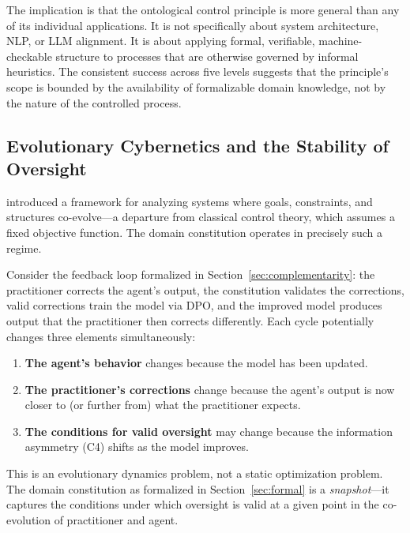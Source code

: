 \documentclass[11pt]{article}
\begin{document}
The implication is that the ontological control principle is more general than any of its individual applications.
It is not specifically about system architecture, NLP, or LLM alignment.
It is about applying formal, verifiable, machine-checkable structure to processes that are otherwise governed by informal heuristics.
The consistent success across five levels suggests that the principle's scope is bounded by the availability of formalizable domain knowledge, not by the nature of the controlled process.

\subsection{Evolutionary Cybernetics and the Stability of Oversight}
\label{sec:disc-evolutionary}

\citet{palagin2025evolutionary} introduced a framework for analyzing systems where goals, constraints, and structures co-evolve---a departure from classical control theory, which assumes a fixed objective function.
The domain constitution operates in precisely such a regime.

Consider the feedback loop formalized in Section~\ref{sec:complementarity}: the practitioner corrects the agent's output, the constitution validates the corrections, valid corrections train the model via DPO, and the improved model produces output that the practitioner then corrects differently.
Each cycle potentially changes three elements simultaneously:

\begin{enumerate}[nosep]
\item \textbf{The agent's behavior} changes because the model has been updated.
\item \textbf{The practitioner's corrections} change because the agent's output is now closer to (or further from) what the practitioner expects.
\item \textbf{The conditions for valid oversight} may change because the information asymmetry (C4) shifts as the model improves.
\end{enumerate}

This is an evolutionary dynamics problem, not a static optimization problem.
The domain constitution as formalized in Section~\ref{sec:formal} is a \emph{snapshot}---it captures the conditions under which oversight is valid at a given point in the co-evolution of practitioner and agent.
\end{document}
